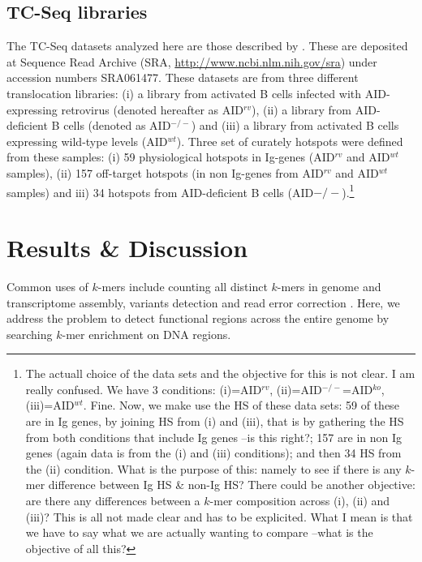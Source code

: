 \documentclass{bioinfo}
\begin{document}
\subsection{TC-Seq libraries}\label{methods:tcseqhs}
The TC-Seq datasets analyzed here are those described by \cite{pmid21962510}. These are deposited at Sequence Read Archive (SRA, \url{http://www.ncbi.nlm.nih.gov/sra}) under accession numbers SRA061477. These datasets are from three different translocation libraries: (i) a library from activated B cells infected with AID-expressing retrovirus (denoted hereafter as AID$^{rv}$), (ii) a library from AID-deficient B cells (denoted as AID$^{-/-}$) and (iii)  a library from activated B cells expressing wild-type levels (AID$^{wt}$). Three set of curately hotspots were defined from these samples: (i) 59 physiological hotspots in Ig-genes (AID$^{rv}$ and AID$^{wt}$ samples), (ii) 157 off-target hotspots (in non Ig-genes from AID$^{rv}$ and  AID$^{wt}$ samples) and iii) 34 hotspots from AID-deficient B cells (AID$-/-$).\footnote{The actuall choice of the data sets and the objective for this is not clear. I am really confused. We have 3 conditions: (i)=AID$^{rv}$, (ii)=AID$^{-/-}$=AID$^{ko}$, (iii)=AID$^{wt}$. Fine. Now, we make use the HS of these data sets: 59 of these are in Ig genes, by joining HS from (i) and (iii), that is by gathering the HS from both conditions that include Ig genes --is this right?; 157 are in non Ig genes (again data is from the (i) and (iii) conditions); and then 34 HS from the (ii) condition. What is the purpose of this: namely to see if there is any $k$-mer difference between Ig HS \& non-Ig HS? There could be another objective: are there any differences between a $k$-mer composition across (i), (ii) and (iii)? This is all not made clear and has to be explicited. What I mean is that we have to say what we are actually wanting to compare --what is the objective of all this?}


\section{Results \& Discussion}

Common uses of $k$-mers include counting all distinct $k$-mers in genome and transcriptome assembly, variants detection and read error correction \cite{pmid23325618}. Here, we address the problem to detect functional regions across the entire genome by searching $k$-mer enrichment on DNA regions.
\end{document}
